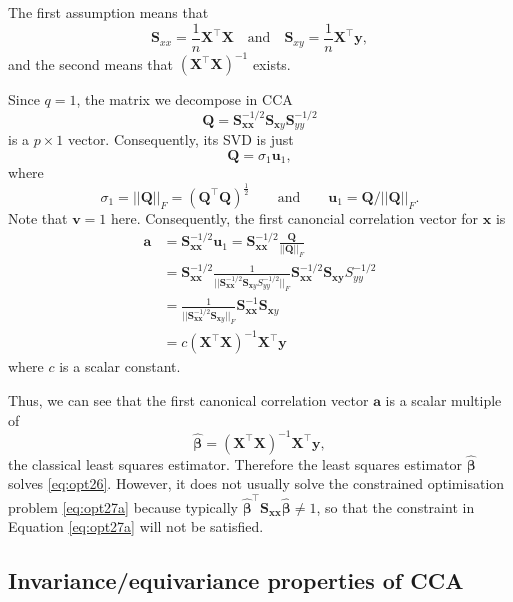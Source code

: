\documentclass[]{book}
\theoremstyle{definition}
\theoremstyle{definition}
\theoremstyle{definition}
\theoremstyle{remark}
\begin{document}
The first assumption means that
\[\mathbf S_{xx}=\frac{1}{n}\mathbf X^\top \mathbf X\quad \mbox{and}\quad \mathbf S_{xy}=\frac{1}{n}\mathbf X^\top \mathbf y,\] and the second means that \((\mathbf X^\top \mathbf X)^{-1}\) exists.

Since \(q=1\), the matrix we decompose in CCA
\[
\mathbf Q=\mathbf S_{\mathbf x\mathbf x}^{-1/2} \mathbf S_{\mathbf xy}\mathbf S_{yy}^{-1/2}
\]
is a \(p \times 1\) vector. Consequently, its
SVD is just
\[
\mathbf Q=\sigma_1 \mathbf u_1,
\]
where
\[
\sigma_1=\vert \vert \mathbf Q\vert \vert_F = (\mathbf Q^\top \mathbf Q)^{\frac{1}{2}} \qquad \text{and} \qquad \mathbf u_1=\mathbf Q/\vert \vert \mathbf Q\vert \vert_F.
\]
Note that \(\mathbf v=1\) here.
Consequently, the first canoncial correlation vector for \(\mathbf x\) is
\begin{align*}
\mathbf a&=\mathbf S_{\mathbf x\mathbf x}^{-1/2}\mathbf u_1 =\mathbf S_{\mathbf x\mathbf x}^{-1/2} \frac{\mathbf Q}{||\mathbf Q||_F}\\
&=\mathbf S_{\mathbf x\mathbf x}^{-1/2} \frac{1}{\vert \vert \mathbf S_{\mathbf x\mathbf x}^{-1/2}\mathbf S_{\mathbf xy}S_{yy}^{-1/2}\vert \vert_F}\mathbf S_{\mathbf x\mathbf x}^{-1/2}\mathbf S_{\mathbf x\mathbf y}S_{yy}^{-1/2}\\
&=\frac{1}{\vert \vert \mathbf S_{\mathbf x\mathbf x}^{-1/2}\mathbf S_{\mathbf xy}\vert \vert_F}\mathbf S_{\mathbf x\mathbf x}^{-1}\mathbf S_{\mathbf xy}\\
&= c (\mathbf X^\top \mathbf X)^{-1}\mathbf X^\top \mathbf y
\end{align*}
where \(c\) is a scalar constant.

Thus, we can see that the first canonical correlation vector \(\mathbf a\) is a scalar multiple of
\[
\hat{\pmb \beta}=\left ( \mathbf X^\top \mathbf X\right )^{-1} \mathbf X^\top \mathbf y,
\]
the classical least squares estimator. Therefore the least squares estimator \(\hat{\pmb \beta}\) solves \eqref{eq:opt26}. However, it does not usually solve the constrained optimisation problem \eqref{eq:opt27a} because typically \(\hat{\pmb \beta}^\top \mathbf S_{\mathbf x\mathbf x}\hat{\pmb \beta} \not= 1\), so that the constraint in Equation \eqref{eq:opt27a} will not be satisfied.

\hypertarget{invarianceequivariance-properties-of-cca}{%
\subsection{Invariance/equivariance properties of CCA}\label{invarianceequivariance-properties-of-cca}}
\end{document}
